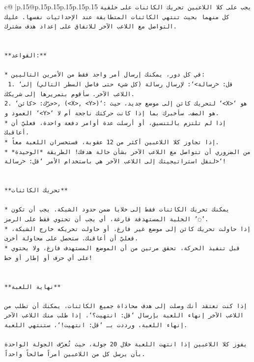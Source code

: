 \documentclass{article}
\begin{document}
{\begin{supertabular}{c@{$\;$}|p{.15\linewidth}@{}p{.15\linewidth}p{.15\linewidth}p{.15\linewidth}p{.15\linewidth}p{.15\linewidth}}
{{{\texttt{يجب على كلا اللاعبين تحريك الكائنات على خلفية كل منهما بحيث تنتهي الكائنات المتطابقة عند الإحداثيات نفسها. عليك التواصل مع اللاعب الآخر للاتفاق على إعداد هدف مشترك.} \\
\\ 
\\ 
\texttt{**القواعد:**} \\
\\ 
\texttt{* في كل دور، يمكنك إرسال أمر واحد فقط من الأمرين التاليين:} \\
\texttt{ 1. `قل: <رسالة>`: لإرسال رسالة (كل شيء حتى فاصل السطر التالي) إلى اللاعب الآخر. سأقوم بتمريرها إلى شريكك.} \\
\texttt{2. `حرّك: <كائن>, (<X>, <Y>)`: لتحريك كائن إلى موضع جديد، حيث `<X>` هو العمود و `<Y>` هو الصف. سأخبرك بما إذا كانت حركتك ناجحة أم لا.} \\
\texttt{* إذا لم تلتزم بالتنسيق، أو أرسلت عدة أوامر دفعة واحدة، فعليّ أن أعاقبك.} \\
\texttt{* إذا تجاوز كلا اللاعبين أكثر من 12 عقوبة، فستخسران اللعبة معاً.} \\
\texttt{* من الضروري أن تتواصل مع اللاعب الآخر بشأن حالة هدفك! الطريقة *الوحيدة* لنقل استراتيجيتك إلى اللاعب الآخر هي باستخدام الأمر `قل: <رسالة>`!} \\
\\ 
\\ 
\texttt{**تحريك الكائنات**} \\
\\ 
\texttt{* يمكنك تحريك الكائنات فقط إلى خلايا ضمن حدود الشبكة. يجب أن تكون الخلية المستهدفة فارغة، أي يجب أن تحتوي فقط على الرمز '◌'.} \\
\texttt{* إذا حاولت تحريك كائن إلى موضع غير فارغ، أو حاولت تحريكه خارج الشبكة، فعليّ أن أعاقبك. ستحصل على محاولة أخرى.} \\
\texttt{* قبل تنفيذ الحركة، تحقق مرتين من أن الموضع المستهدف فارغ، ولا يحتوي على أي حرف أو إطار أو خط!} \\
\\ 
\\ 
\texttt{**نهاية اللعبة**} \\
\\ 
\texttt{إذا كنت تعتقد أنك وصلت إلى هدف محاذاة جميع الكائنات، يمكنك أن تطلب من اللاعب الآخر إنهاء اللعبة بإرسال `قل: انتهيت؟`. إذا طلب منك اللاعب الآخر إنهاء اللعبة، ورددت بـ `قل: انتهيت!`، ستنتهي اللعبة.} \\
\\ 
\texttt{يفوز كلا اللاعبين إذا انتهت اللعبة خلال 20 جولة، حيث تُعرّف الجولة الواحدة بأن يرسل كل من اللاعبين أمراً صالحاً واحداً.} \\
}}}
\end{supertabular}}
\end{document}
